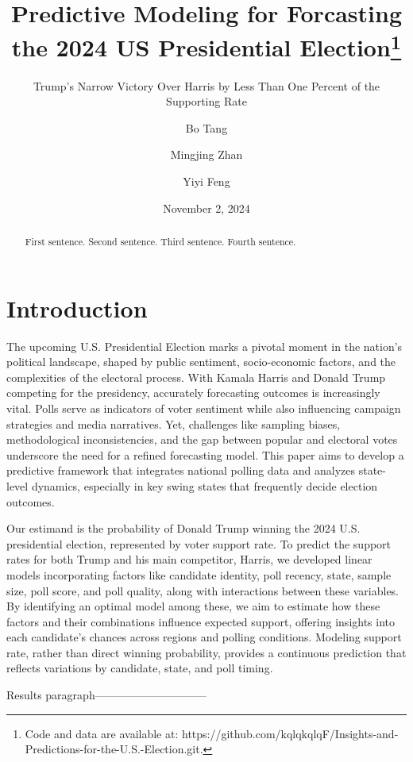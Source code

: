 \documentclass[
  letterpaper,
  DIV=11,
  numbers=noendperiod]{scrartcl}
\title{Predictive Modeling for Forcasting the 2024 US Presidential
Election\thanks{Code and data are available at:
https://github.com/kqlqkqlqF/Insights-and-Predictions-for-the-U.S.-Election.git.}}
\subtitle{Trump's Narrow Victory Over Harris by Less Than One Percent of
the Supporting Rate}
\author{Bo Tang \and Mingjing Zhan \and Yiyi Feng}
\date{November 2, 2024}
\begin{document}
\maketitle
\begin{abstract}
First sentence. Second sentence. Third sentence. Fourth sentence.
\end{abstract}
\ifdefined\Shaded\renewenvironment{Shaded}{\begin{tcolorbox}[frame hidden, enhanced, borderline west={3pt}{0pt}{shadecolor}, boxrule=0pt, interior hidden, sharp corners, breakable]}{\end{tcolorbox}}\fi

\hypertarget{introduction}{%
\section{Introduction}\label{introduction}}

The upcoming U.S. Presidential Election marks a pivotal moment in the
nation's political landscape, shaped by public sentiment, socio-economic
factors, and the complexities of the electoral process. With Kamala
Harris and Donald Trump competing for the presidency, accurately
forecasting outcomes is increasingly vital. Polls serve as indicators of
voter sentiment while also influencing campaign strategies and media
narratives. Yet, challenges like sampling biases, methodological
inconsistencies, and the gap between popular and electoral votes
underscore the need for a refined forecasting model. This paper aims to
develop a predictive framework that integrates national polling data and
analyzes state-level dynamics, especially in key swing states that
frequently decide election outcomes.

Our estimand is the probability of Donald Trump winning the 2024 U.S.
presidential election, represented by voter support rate. To predict the
support rates for both Trump and his main competitor, Harris, we
developed linear models incorporating factors like candidate identity,
poll recency, state, sample size, poll score, and poll quality, along
with interactions between these variables. By identifying an optimal
model among these, we aim to estimate how these factors and their
combinations influence expected support, offering insights into each
candidate's chances across regions and polling conditions. Modeling
support rate, rather than direct winning probability, provides a
continuous prediction that reflects variations by candidate, state, and
poll timing.

Results paragraph------------------------------
\end{document}
